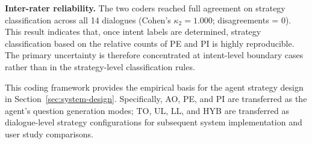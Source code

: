 \documentclass[manuscript,review,anonymous]{acmart}
\begin{document}
\textbf{Inter-rater reliability.} The two coders reached full agreement on strategy classification across all 14 dialogues (Cohen's $\kappa_2 = \mathbf{1.000}$; disagreements = 0). This result indicates that, once intent labels are determined, strategy classification based on the relative counts of PE and PI is highly reproducible. The primary uncertainty is therefore concentrated at intent-level boundary cases rather than in the strategy-level classification rules.

This coding framework provides the empirical basis for the agent strategy design in Section~\ref{sec:system-design}. Specifically, AO, PE, and PI are transferred as the agent's question generation modes; TO, UL, LL, and HYB are transferred as dialogue-level strategy configurations for subsequent system implementation and user study comparisons.

\end{document}
